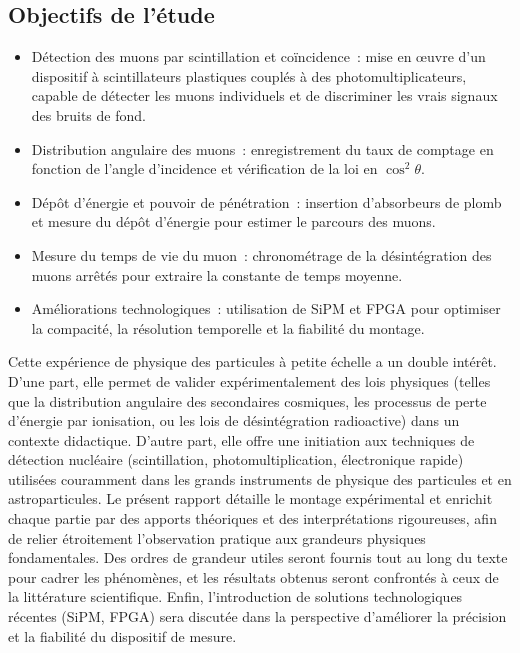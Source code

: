 \documentclass[a4paper,12pt,twoside]{article}
\begin{document}
\subsection{Objectifs de l’étude}
\begin{itemize}
  \item Détection des muons par scintillation et coïncidence : mise en œuvre d’un dispositif à scintillateurs plastiques couplés à des photomultiplicateurs, capable de détecter les muons individuels et de discriminer les vrais signaux des bruits de fond.
  \item Distribution angulaire des muons : enregistrement du taux de comptage en fonction de l’angle d’incidence et vérification de la loi en $\cos^2\theta$.
  \item Dépôt d’énergie et pouvoir de pénétration : insertion d’absorbeurs de plomb et mesure du dépôt d’énergie pour estimer le parcours des muons.
  \item Mesure du temps de vie du muon : chronométrage de la désintégration des muons arrêtés pour extraire la constante de temps moyenne.
  \item Améliorations technologiques : utilisation de SiPM et FPGA pour optimiser la compacité, la résolution temporelle et la fiabilité du montage.
\end{itemize}

Cette expérience de physique des particules à petite échelle a un double intérêt. D’une part, elle permet de valider expérimentalement des lois physiques (telles que la distribution angulaire des secondaires cosmiques, les processus de perte d’énergie par ionisation, ou les lois de désintégration radioactive) dans un contexte didactique. D’autre part, elle offre une initiation aux techniques de détection nucléaire (scintillation, photomultiplication, électronique rapide) utilisées couramment dans les grands instruments de physique des particules et en astroparticules. Le présent rapport détaille le montage expérimental et enrichit chaque partie par des apports théoriques et des interprétations rigoureuses, afin de relier étroitement l’observation pratique aux grandeurs physiques fondamentales. Des ordres de grandeur utiles seront fournis tout au long du texte pour cadrer les phénomènes, et les résultats obtenus seront confrontés à ceux de la littérature scientifique. Enfin, l’introduction de solutions technologiques récentes (SiPM, FPGA) sera discutée dans la perspective d’améliorer la précision et la fiabilité du dispositif de mesure.
\end{document}
